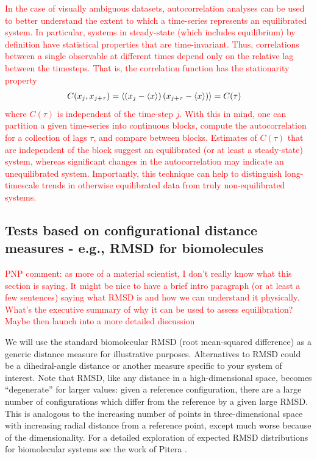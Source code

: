 \textcolor{red}{In the case of visually ambiguous datasets, autocorrelation analyses can be used to better understand the extent to which a time-series represents an equilibrated system.  In particular, systems in steady-state (which includes equilibrium) by definition have statistical properties that are time-invariant.  Thus, correlations between a single observable at different times depend only on the relative lag between the timesteps.  That is, the correlation function has the stationarity property}
\begin{align}
C(x_j,x_{j+\tau}) &= \langle  \left(x_j - \langle x \rangle \right) \left(x_{j+\tau} - \langle x \rangle \right)  \rangle = C(\tau)
\end{align}
\textcolor{red}{where $C(\tau)$ is independent of the time-step $j$.  With this in mind, one can partition a given time-series into continuous blocks, compute the autocorrelation for a collection of lags $\tau$, and compare between blocks.  Estimates of $C(\tau)$ that are independent of the block suggest an equilibrated (or at least a steady-state) system, whereas significant changes in the autocorrelation may indicate an unequilibrated system.  Importantly, this technique can help to distinguish long-timescale trends in otherwise equilibrated data from truly non-equilibrated systems.}

\subsection{Tests based on configurational distance measures - e.g., RMSD for biomolecules}
\textcolor{red}{PNP comment: as more of a material scientist, I don't really know what this section is saying.  It might be nice to have a brief intro paragraph (or at least a few sentences) saying what RMSD is and how we can understand it physically.  What's the executive summary of why it can be used to assess equilibration?  Maybe then launch into a more detailed discussion}

We will use the standard biomolecular RMSD (root mean-squared difference) as a generic distance measure for illustrative purposes.
Alternatives to RMSD could be a dihedral-angle distance or another measure specific to your system of interest.
Note that RMSD, like any distance in a high-dimensional space, becomes ``degenerate'' for larger values: given a reference configuration, there are a large number of configurations which differ from the reference by a given large RMSD. This is analogous to the increasing number of points in three-dimensional space with increasing radial distance from a reference point, except much worse because of the dimensionality. For a detailed exploration of expected RMSD distributions for biomolecular systems see the work of Pitera \citep{Pitera2014}.

